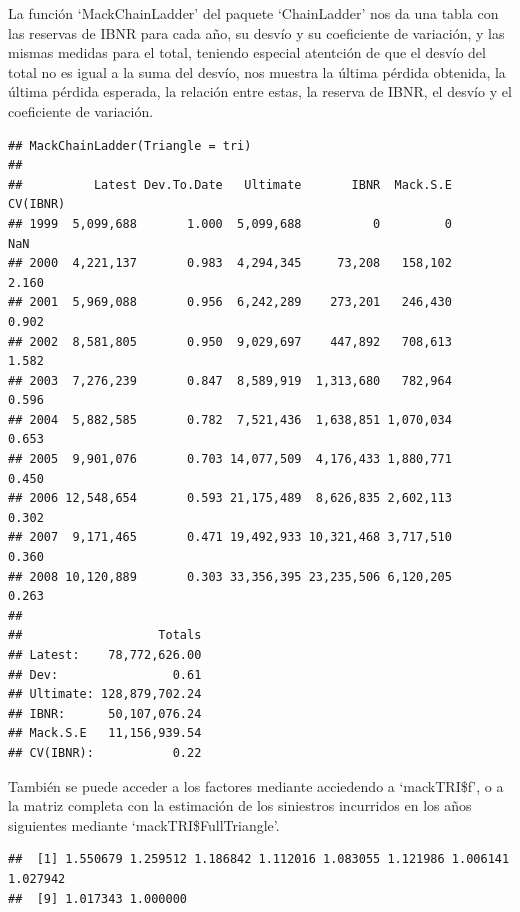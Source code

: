 \documentclass[
  12pt,
]{article}
\begin{document}
La función `MackChainLadder' del paquete `ChainLadder' nos da una tabla
con las reservas de IBNR para cada año, su desvío y su coeficiente de
variación, y las mismas medidas para el total, teniendo especial
atentción de que el desvío del total no es igual a la suma del desvío,
nos muestra la última pérdida obtenida, la última pérdida esperada, la
relación entre estas, la reserva de IBNR, el desvío y el coeficiente de
variación.

\begin{verbatim}
## MackChainLadder(Triangle = tri)
## 
##          Latest Dev.To.Date   Ultimate       IBNR  Mack.S.E CV(IBNR)
## 1999  5,099,688       1.000  5,099,688          0         0      NaN
## 2000  4,221,137       0.983  4,294,345     73,208   158,102    2.160
## 2001  5,969,088       0.956  6,242,289    273,201   246,430    0.902
## 2002  8,581,805       0.950  9,029,697    447,892   708,613    1.582
## 2003  7,276,239       0.847  8,589,919  1,313,680   782,964    0.596
## 2004  5,882,585       0.782  7,521,436  1,638,851 1,070,034    0.653
## 2005  9,901,076       0.703 14,077,509  4,176,433 1,880,771    0.450
## 2006 12,548,654       0.593 21,175,489  8,626,835 2,602,113    0.302
## 2007  9,171,465       0.471 19,492,933 10,321,468 3,717,510    0.360
## 2008 10,120,889       0.303 33,356,395 23,235,506 6,120,205    0.263
## 
##                   Totals
## Latest:    78,772,626.00
## Dev:                0.61
## Ultimate: 128,879,702.24
## IBNR:      50,107,076.24
## Mack.S.E   11,156,939.54
## CV(IBNR):           0.22
\end{verbatim}

También se puede acceder a los factores mediante acciedendo a
`mackTRI\$f', o a la matriz completa con la estimación de los siniestros
incurridos en los años siguientes mediante `mackTRI\$FullTriangle'.

\begin{verbatim}
##  [1] 1.550679 1.259512 1.186842 1.112016 1.083055 1.121986 1.006141 1.027942
##  [9] 1.017343 1.000000
\end{verbatim}
\end{document}
